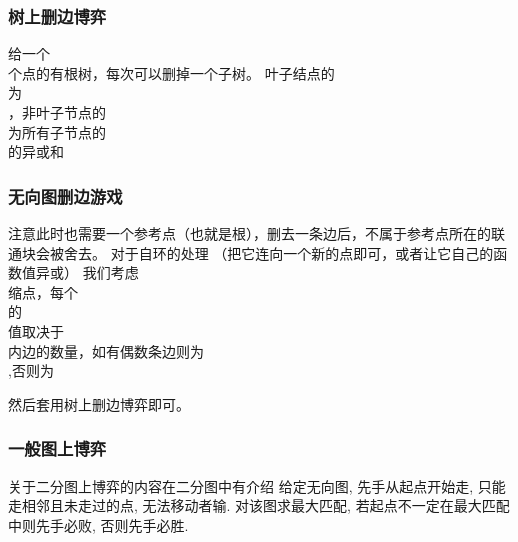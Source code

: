 \documentclass[8pt,a4paper]{article}
\newcommand{\txt}[1]{\par\noindent\footnotesize #1}
\newcommand{\inlineformula}[1]{\ensuremath{}}
\newcommand{\displayformula}[1]{%
    \vspace{0.2em}
    \[
        
    \]
}
\begin{document}
\begin{multicols}{2}
        \subsubsection{树上删边博弈}
            \txt{给一个\displayformula{./assets/formulas_tex/formula_569.tex}个点的有根树，每次可以删掉一个子树。
叶子结点的\displayformula{./assets/formulas_tex/formula_570.tex}为\displayformula{./assets/formulas_tex/formula_571.tex}，非叶子节点的\displayformula{./assets/formulas_tex/formula_572.tex}为所有子节点的\displayformula{./assets/formulas_tex/formula_573.tex}的异或和}
        \subsubsection{无向图删边游戏}
            \txt{注意此时也需要一个参考点（也就是根），删去一条边后，不属于参考点所在的联通块会被舍去。
对于自环的处理
（把它连向一个新的点即可，或者让它自己的函数值异或\inlineformula{./assets/formulas_tex/formula_574.tex}）
我们考虑\displayformula{./assets/formulas_tex/formula_575.tex}缩点，每个\displayformula{./assets/formulas_tex/formula_576.tex}的\displayformula{./assets/formulas_tex/formula_577.tex}值取决于\displayformula{./assets/formulas_tex/formula_578.tex}内边的数量，如有偶数条边则为\displayformula{./assets/formulas_tex/formula_579.tex},否则为\displayformula{./assets/formulas_tex/formula_580.tex}
然后套用树上删边博弈即可。}
        \subsubsection{一般图上博弈}
            \txt{关于二分图上博弈的内容在二分图中有介绍
给定无向图, 先手从起点开始走, 只能走相邻且未走过的点, 无法移动者输.
对该图求最大匹配, 若起点不一定在最大匹配中则先手必败, 否则先手必胜.}

\end{multicols}
\end{document}
